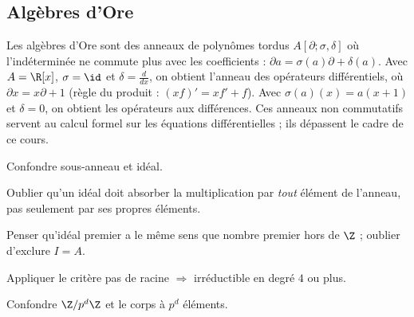 \subsection{Algèbres d'Ore}
\begin{remarque}
Les algèbres d'Ore sont des anneaux de polynômes \og tordus \fg{} $A[\partial;\sigma,\delta]$ où l'indéterminée ne commute plus avec les coefficients : $\partial a=\sigma(a)\partial+\delta(a)$. Avec $A=\R[x]$, $\sigma=\id$ et $\delta=\frac{d}{dx}$, on obtient l'anneau des opérateurs différentiels, où $\partial x=x\partial+1$ (règle du produit : $(xf)'=xf'+f$). Avec $\sigma(a)(x)=a(x+1)$ et $\delta=0$, on obtient les opérateurs aux différences. Ces anneaux non commutatifs servent au calcul formel sur les équations différentielles ; ils dépassent le cadre de ce cours.
\end{remarque}

\begin{erreurs}
\item Confondre sous-anneau et idéal.
\item Oublier qu'un idéal doit absorber la multiplication par \emph{tout} élément de l'anneau, pas seulement par ses propres éléments.
\item Penser qu'\og idéal premier \fg{} a le même sens que \og nombre premier \fg{} hors de $\Z$ ; oublier d'exclure $I=A$.
\item Appliquer le critère \og pas de racine $\Rightarrow$ irréductible \fg{} en degré $4$ ou plus.
\item Confondre $\Z/p^d\Z$ et le corps à $p^d$ éléments.
\end{erreurs}

\exercices



